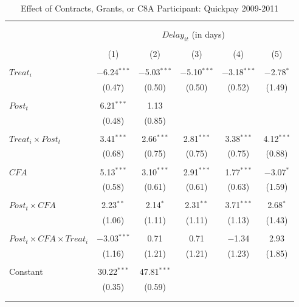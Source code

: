 \documentclass[
]{article}
\begin{document}
\begin{table}[H] \centering 
  \caption{Effect of Contracts, Grants, or C8A Participant: Quickpay 2009-2011} 
  \label{} 
\small 
\begin{tabular}{@{\extracolsep{-2pt}}lccccc} 
\\[-1.8ex]\hline 
\hline \\[-1.8ex] 
\\[-1.8ex] & \multicolumn{5}{c}{$Delay_{it}$ (in days)} \\ 
\\[-1.8ex] & (1) & (2) & (3) & (4) & (5)\\ 
\hline \\[-1.8ex] 
 $Treat_i$ & $-$6.24$^{***}$ & $-$5.03$^{***}$ & $-$5.10$^{***}$ & $-$3.18$^{***}$ & $-$2.78$^{*}$ \\ 
  & (0.47) & (0.50) & (0.50) & (0.52) & (1.49) \\ 
  & & & & & \\ 
 $Post_t$ & 6.21$^{***}$ & 1.13 &  &  &  \\ 
  & (0.48) & (0.85) &  &  &  \\ 
  & & & & & \\ 
 $Treat_i \times Post_t$ & 3.41$^{***}$ & 2.66$^{***}$ & 2.81$^{***}$ & 3.38$^{***}$ & 4.12$^{***}$ \\ 
  & (0.68) & (0.75) & (0.75) & (0.75) & (0.88) \\ 
  & & & & & \\ 
 $CFA$ & 5.13$^{***}$ & 3.10$^{***}$ & 2.91$^{***}$ & 1.77$^{***}$ & $-$3.07$^{*}$ \\ 
  & (0.58) & (0.61) & (0.61) & (0.63) & (1.59) \\ 
  & & & & & \\ 
 $Post_t \times CFA$ & 2.23$^{**}$ & 2.14$^{*}$ & 2.31$^{**}$ & 3.71$^{***}$ & 2.68$^{*}$ \\ 
  & (1.06) & (1.11) & (1.11) & (1.13) & (1.43) \\ 
  & & & & & \\ 
 $Post_t \times CFA \times Treat_i$ & $-$3.03$^{***}$ & 0.71 & 0.71 & $-$1.34 & 2.93 \\ 
  & (1.16) & (1.21) & (1.21) & (1.23) & (1.85) \\ 
  & & & & & \\ 
 Constant & 30.22$^{***}$ & 47.81$^{***}$ &  &  &  \\ 
  & (0.35) & (0.59) &  &  &  \\ 
  & & & & & \\ 
\hline \\[-1.8ex] 

\end{tabular}
\end{table}
\end{document}
